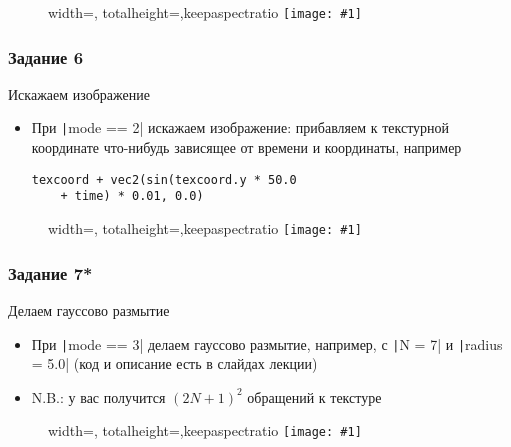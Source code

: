 \documentclass[10pt]{beamer}
\newcommand{\slideimage}[1]{
  \begin{figure}
    \begin{adjustbox}{width=\textwidth, totalheight=\textheight-2\baselineskip-2\baselineskip,keepaspectratio}
      \texttt{[image: \#1]}
    \end{adjustbox}
  \end{figure}
}
\begin{document}
\begin{frame}[fragile]
\slideimage{5.png}
\end{frame}

\begin{frame}[fragile]
\frametitle{Задание 6}
Искажаем изображение
\begin{itemize}
\item При \texttt|mode == 2| искажаем изображение: прибавляем к текстурной координате что-нибудь зависящее от времени и координаты, например 
\begin{verbatim}
texcoord + vec2(sin(texcoord.y * 50.0
    + time) * 0.01, 0.0)
\end{verbatim}
\end{itemize}
\end{frame}

\begin{frame}[fragile]
\slideimage{6.png}
\end{frame}

\begin{frame}[fragile]
\frametitle{Задание 7*}
Делаем гауссово размытие
\begin{itemize}
\item При \texttt|mode == 3| делаем гауссово размытие, например, с \texttt|N = 7| и \texttt|radius = 5.0| (код и описание есть в слайдах лекции)
\item N.B.: у вас получится \begin{math}(2N+1)^2\end{math} обращений к текстуре
\end{itemize}
\end{frame}

\begin{frame}[fragile]
\slideimage{7.png}
\end{frame}
\end{document}
